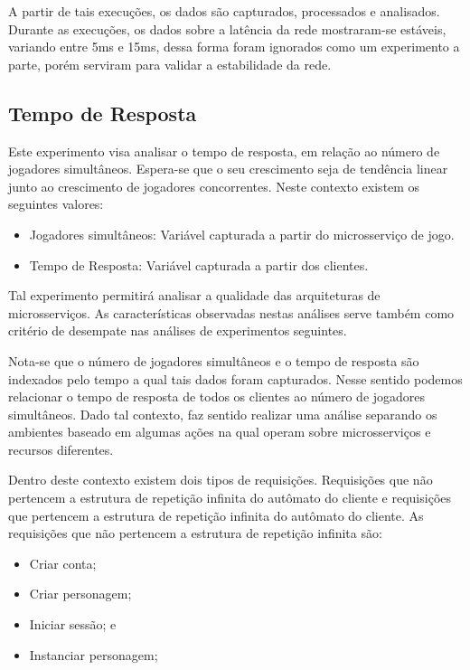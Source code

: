 A partir de tais execuções, os dados são capturados, processados e analisados.
%
Durante as execuções, os dados sobre a latência da rede mostraram-se estáveis, variando entre 5ms e 15ms, dessa forma foram ignorados como um experimento a parte, porém serviram para validar a estabilidade da rede.


\subsection{Tempo de Resposta}



Este experimento visa analisar o tempo de resposta, em relação ao número de jogadores simultâneos.
%
Espera-se que o seu crescimento seja de tendência linear junto ao crescimento de jogadores concorrentes.
%
Neste contexto existem os seguintes valores:



\begin{itemize}
    \item Jogadores simultâneos: Variável capturada a partir do microsserviço de jogo.
    \item Tempo de Resposta: Variável capturada a partir dos clientes.
\end{itemize}

Tal experimento permitirá analisar a qualidade das arquiteturas de microsserviços.
%
As características observadas nestas análises serve também como critério de desempate nas análises de experimentos seguintes.

Nota-se que o número de jogadores simultâneos e o tempo de resposta são indexados pelo tempo a qual tais dados foram capturados.
%
Nesse sentido podemos relacionar o tempo de resposta de todos os clientes ao número de jogadores simultâneos.
%
Dado tal contexto, faz sentido realizar uma análise separando os ambientes baseado em algumas ações na qual operam sobre microsserviços e recursos diferentes.

Dentro deste contexto existem dois tipos de requisições.
%
Requisições que não pertencem a estrutura de repetição infinita do autômato do cliente e requisições que pertencem a estrutura de repetição infinita do autômato do cliente.
%
As requisições que não pertencem a estrutura de repetição infinita são:

\begin{itemize}
    \item Criar conta;
    \item Criar personagem;
    \item Iniciar sessão; e
    \item Instanciar personagem;
\end{itemize}

